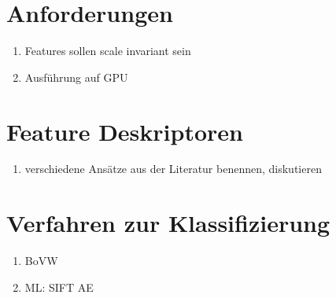 \section{Anforderungen} 

\begin{enumerate}
	\item Features sollen scale invariant sein
	\item Ausführung auf GPU
\end{enumerate}

\section{Feature Deskriptoren}

\begin{enumerate}
	\item verschiedene Ansätze aus der Literatur benennen, diskutieren

\end{enumerate}

\section{Verfahren zur Klassifizierung}

\begin{enumerate}
	\item BoVW
	\item ML: SIFT AE
\end{enumerate}